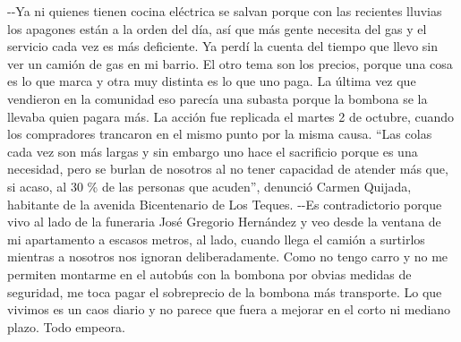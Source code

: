 \documentclass{article}%
\begin{document}
\newline%
%
{-}{-}Ya ni quienes tienen cocina eléctrica se salvan porque con las recientes lluvias los apagones están a la orden del día, así que más gente necesita del gas y el servicio cada vez es más deficiente. Ya perdí la cuenta del tiempo que llevo sin ver un camión de gas en mi barrio. El otro tema son los precios, porque una cosa es lo que marca y otra muy distinta es lo que uno paga. La última vez que vendieron en la comunidad eso parecía una subasta porque la bombona se la llevaba quien pagara más.%
\newline%
%
La acción fue replicada el martes 2 de octubre, cuando los compradores trancaron en el mismo punto por la misma causa. “Las colas cada vez son más largas y sin embargo uno hace el sacrificio porque es una necesidad, pero se burlan de nosotros al no tener capacidad de atender más que, si acaso, al 30 \% de las personas que acuden”, denunció Carmen Quijada, habitante de la avenida Bicentenario de Los Teques.%
\newline%
%
{-}{-}Es contradictorio porque vivo al lado de la funeraria José Gregorio Hernández y veo desde la ventana de mi apartamento a escasos metros, al lado, cuando llega el camión a surtirlos mientras a nosotros nos ignoran deliberadamente. Como no tengo carro y no me permiten montarme en el autobús con la bombona por obvias medidas de seguridad, me toca pagar el sobreprecio de la bombona más transporte. Lo que vivimos es un caos diario y no parece que fuera a mejorar en el corto ni mediano plazo. Todo empeora.%
\newline%
%
\end{document}
